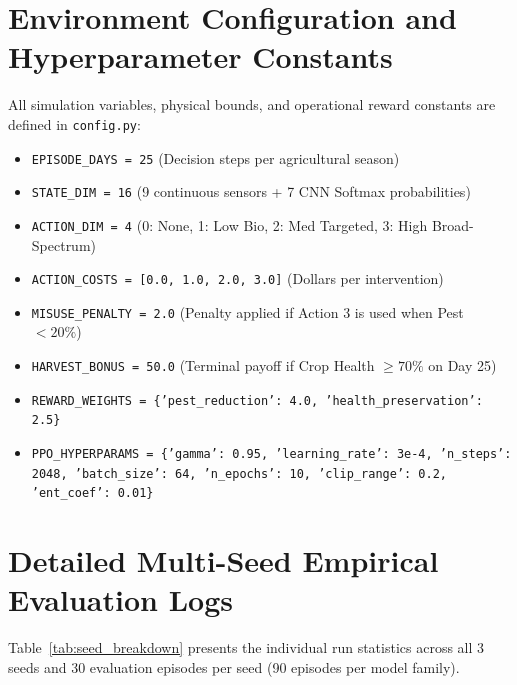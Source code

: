 \documentclass[12pt,a4paper]{report}
\begin{document}
\chapter{Environment Configuration and Hyperparameter Constants}
All simulation variables, physical bounds, and operational reward constants are defined in \texttt{config.py}:
\begin{itemize}
    \item \texttt{EPISODE\_DAYS = 25} (Decision steps per agricultural season)
    \item \texttt{STATE\_DIM = 16} (9 continuous sensors + 7 CNN Softmax probabilities)
    \item \texttt{ACTION\_DIM = 4} (0: None, 1: Low Bio, 2: Med Targeted, 3: High Broad-Spectrum)
    \item \texttt{ACTION\_COSTS = [0.0, 1.0, 2.0, 3.0]} (Dollars per intervention)
    \item \texttt{MISUSE\_PENALTY = 2.0} (Penalty applied if Action 3 is used when Pest $< 20\%$)
    \item \texttt{HARVEST\_BONUS = 50.0} (Terminal payoff if Crop Health $\ge 70\%$ on Day 25)
    \item \texttt{REWARD\_WEIGHTS = \{'pest\_reduction': 4.0, 'health\_preservation': 2.5\}}
    \item \texttt{PPO\_HYPERPARAMS = \{'gamma': 0.95, 'learning\_rate': 3e-4, 'n\_steps': 2048, 'batch\_size': 64, 'n\_epochs': 10, 'clip\_range': 0.2, 'ent\_coef': 0.01\}}
\end{itemize}

\chapter{Detailed Multi-Seed Empirical Evaluation Logs}
Table~\ref{tab:seed_breakdown} presents the individual run statistics across all 3 seeds and 30 evaluation episodes per seed (90 episodes per model family).
\end{document}
